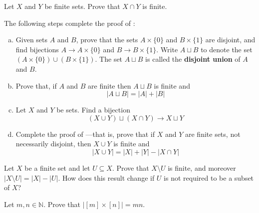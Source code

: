 \begin{exercise}
Let $X$ and $Y$ be finite sets. Prove that $X \cap Y$ is finite.
\end{exercise}

\begin{exercise}
\label{exSizeOfUnion}
The following steps complete the proof of :
\begin{enumerate}[(a)]
\item Given sets $A$ and $B$, prove that the sets $A \times \{ 0 \}$ and $B \times \{ 1 \}$ are disjoint, and find bijections $A \to A \times \{ 0 \}$ and $B \to B \times \{ 1 \}$. Write $A \sqcup B$  to denote the set $(A \times \{ 0 \}) \cup (B \times \{ 1 \})$. The set $A \sqcup B$ is called the \textbf{disjoint union} of $A$ and $B$.
\item Prove that, if $A$ and $B$ are finite then $A \sqcup B$ is finite and
\[ |A \sqcup B| = |A| + |B| \]
\item Let $X$ and $Y$ be sets. Find a bijection
\[ (X \cup Y) \sqcup (X \cap Y) \to X \sqcup Y \]
\item Complete the proof of ---that is, prove that if $X$ and $Y$ are finite sets, not necessarily disjoint, then $X \cup Y$ is finite and
\[ |X \cup Y| = |X| + |Y| - |X \cap Y| \]
\end{enumerate}
\end{exercise}

\begin{exercise}
Let $X$ be a finite set and let $U \subseteq X$. Prove that $X \setminus U$ is finite, and moreover $|X \setminus U| = |X| - |U|$. How does this result change if $U$ is not required to be a subset of $X$?
\end{exercise}

\begin{exercise}
\label{exSizeOfCartesianProduct}
Let $m,n \in \mathbb{N}$. Prove that $|[m] \times [n]| = mn$.
\end{exercise}
